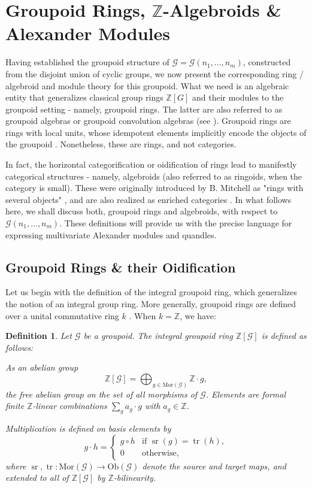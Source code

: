 \documentclass[a4paper,12pt]{article}
\newtheorem{definition}{Definition}[section]
\newcommand{\Z}{\mathbb{Z}}
\newcommand{\calG}{\mathcal{G}}
\newcommand{\Ob}{\mathrm{Ob}}
\newcommand{\Mor}{\mathrm{Mor}}
\begin{document}
\section{Groupoid Rings, $\Z$-Algebroids \& Alexander Modules}

Having established the groupoid structure of $\calG = \calG(n_1, \ldots, n_m)$, constructed from the disjoint union of cyclic groups, we now present the corresponding ring / algebroid and module theory for this groupoid. What we need is an algebraic entity that generalizes classical group rings $\Z[G]$ and their  modules to the  groupoid setting - namely, groupoid rings. The latter are also referred to as groupoid algebras or groupoid convolution algebras  (see \cite{renault2006groupoid, weinstein1996groupoids, khalkhali2013basic, nlab:category_algebra}). Groupoid rings are rings with local units, whose idempotent elements implicitly encode the objects of the groupoid \cite{Wisbauer1991}. Nonetheless, these are rings, and not categories. 

In fact, the horizontal categorification or oidification of rings lead to   manifestly categorical structures - namely, algebroids (also referred to as ringoids, when the category is small). These  were originally introduced by B. Mitchell as "rings with several objects" \cite{Mitchell1972, mitchell1985},  and are also realized as enriched categories  \cite{Kelly1982, nlab:ab-enriched_category}. In what follows here, we shall discuss both, groupoid rings and algebroids, with respect to $\calG(n_1, \ldots, n_m)$. These definitions will provide us with the precise language for expressing multivariate Alexander modules and quandles. 


\subsection{Groupoid Rings \& their Oidification}

Let us begin with the definition of the integral groupoid ring, which
generalizes the notion of an integral group ring.  More generally, groupoid rings are defined over a unital commutative ring $k$  \cite{weinstein1996groupoids,   dokuchaev2, lundstrom2006separable, machado2025non,   nlab:category_algebra}.  
When $k = \Z$, we have:   
\begin{definition}  
Let $\calG$ be a groupoid. The \emph{integral groupoid ring}
$\Z[\calG]$ is defined as follows:

As an abelian group 
\[
  \Z[\calG] = \bigoplus_{g \in \Mor(\calG)} \Z \cdot g,
\]
the free abelian group on the set of all morphisms of $\calG$. Elements
are formal finite $\Z$-linear combinations $\sum_g a_g \cdot g$ with
$a_g \in \Z$.

Multiplication is defined on basis elements by  
\[
  g \cdot h =
  \begin{cases}
    g \circ h & \text{if } \operatorname{sr}(g) = \operatorname{tr}(h), \\
    0         & \text{otherwise,}
  \end{cases}
\]
where $\operatorname{sr}, \operatorname{tr} : \Mor(\calG) \to \Ob(\calG)$ denote the source and target
maps, and extended to all of $\Z[\calG]$ by $\Z$-bilinearity.
\end{definition}
\end{document}

